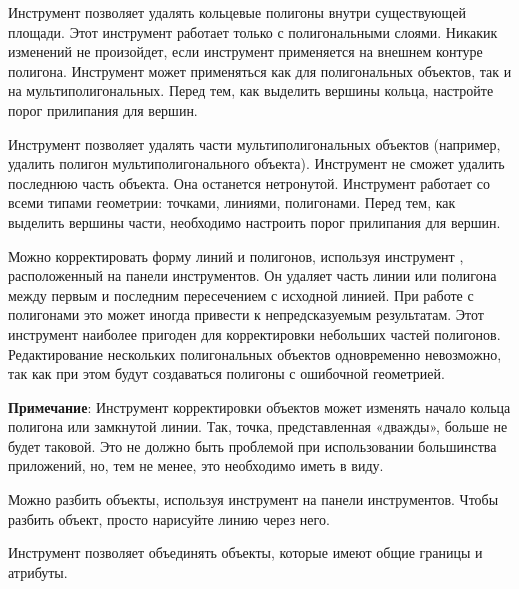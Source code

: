 Инструмент  позволяет удалять
кольцевые полигоны внутри существующей площади. Этот инструмент работает
только с полигональными слоями. Никакик изменений не произойдет, если
инструмент применяется на внешнем контуре полигона. Инструмент может
применяться как для полигональных объектов, так и на мультиполигональных.
Перед тем, как выделить вершины кольца, настройте порог прилипания для вершин.



Инструмент  позволяет удалять
части мультиполигональных объектов (например, удалить полигон
мультиполигонального объекта). Инструмент не сможет удалить последнюю часть
объекта. Она останется нетронутой. Инструмент работает со всеми типами
геометрии: точками, линиями, полигонами. Перед тем, как выделить вершины
части, необходимо настроить порог прилипания для вершин.


Можно корректировать форму линий и полигонов, используя инструмент
, расположенный на
панели инструментов. Он удаляет часть линии или полигона между первым и
последним пересечением с исходной линией. При работе с полигонами это
может иногда привести к непредсказуемым результатам. Этот инструмент
наиболее пригоден для корректировки небольших частей полигонов. Редактирование
нескольких  полигональных объектов одновременно невозможно, так как при этом
будут создаваться полигоны с ошибочной геометрией.

\textbf{Примечание}: Инструмент корректировки объектов может изменять начало
кольца полигона или замкнутой линии. Так, точка, представленная «дважды»,
больше не будет таковой. Это не должно быть проблемой при использовании
большинства приложений, но, тем не менее, это необходимо иметь в виду.


Можно разбить объекты, используя инструмент
 на панели
инструментов. Чтобы разбить объект, просто нарисуйте линию через него.


Инструмент 
позволяет объединять объекты, которые имеют общие границы и атрибуты.

